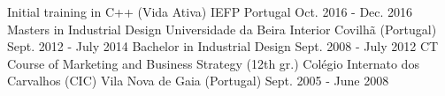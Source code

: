 

\begin{cventries}

  \cventry
    {Initial training in C++ (Vida Ativa)} %
    {IEFP} %
    {Portugal} %
    {Oct. 2016 - Dec. 2016} %
    {}
  \cventry
    {Masters in Industrial Design} %
    {Universidade da Beira Interior} %
    {Covilhã (Portugal)} %
    {Sept. 2012 - July 2014} %
    {}
  \cventry
    {Bachelor in Industrial Design} %
    {} %
    {} %
    {Sept. 2008 - July 2012} %
    {}
  \cventry
    {CT Course of Marketing and Business Strategy (12th gr.)} %
    {Colégio Internato dos Carvalhos (CIC)} %
    {Vila Nova de Gaia (Portugal)} %
    {Sept. 2005 - June 2008} %
    {}
    \vspace{0.5cm}

\end{cventries}
